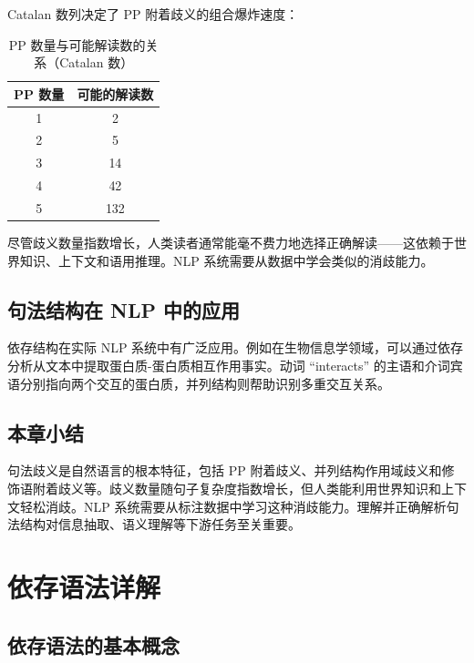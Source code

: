 \documentclass[a4paper]{article}
\begin{document}
Catalan 数列决定了 PP 附着歧义的组合爆炸速度：

\begin{table}[H]
\centering
\begin{tabular}{cc}
\toprule
\textbf{PP 数量} & \textbf{可能的解读数} \\
\midrule
1 & 2 \\
2 & 5 \\
3 & 14 \\
4 & 42 \\
5 & 132 \\
\bottomrule
\end{tabular}
\caption{PP 数量与可能解读数的关系（Catalan 数）}
\end{table}

尽管歧义数量指数增长，人类读者通常能毫不费力地选择正确解读——这依赖于世界知识、上下文和语用推理。NLP 系统需要从数据中学会类似的消歧能力。

\subsection{句法结构在 NLP 中的应用}





依存结构在实际 NLP 系统中有广泛应用。例如在生物信息学领域，可以通过依存分析从文本中提取蛋白质-蛋白质相互作用事实。动词 ``interacts'' 的主语和介词宾语分别指向两个交互的蛋白质，并列结构则帮助识别多重交互关系。

\subsection{本章小结}

句法歧义是自然语言的根本特征，包括 PP 附着歧义、并列结构作用域歧义和修饰语附着歧义等。歧义数量随句子复杂度指数增长，但人类能利用世界知识和上下文轻松消歧。NLP 系统需要从标注数据中学习这种消歧能力。理解并正确解析句法结构对信息抽取、语义理解等下游任务至关重要。


\section{依存语法详解}

\subsection{依存语法的基本概念}
\end{document}
